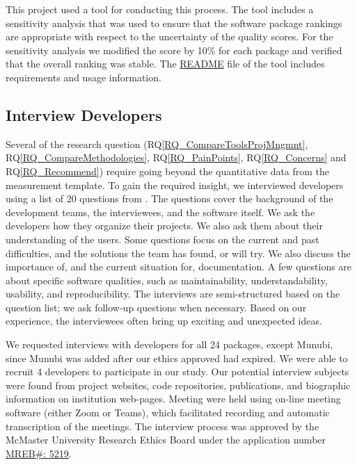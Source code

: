 \documentclass[final, 3p, times, authoryear]{elsarticle}
\newcommand{\rqref}[1]{RQ\ref{#1}}
\begin{document}
This project used a tool for conducting this process. The tool includes a
sensitivity analysis that was used to ensure that the software package rankings
are appropriate with respect to the uncertainty of the quality scores. For the
sensitivity analysis we modified the score by 10\% for each package and verified
that the overall ranking was stable.  The
\href{https://github.com/smiths/AIMSS/blob/master/StateOfPractice/AHP2020/LBM/README.txt}{README}
file of the tool includes requirements and usage information.

\subsection{Interview Developers} \label{SecSurvey}

Several of the research question (\rqref{RQ_CompareToolsProjMngmnt},
\rqref{RQ_CompareMethodologies}, \rqref{RQ_PainPoints}, \rqref{RQ_Concerns} and
\rqref{RQ_Recommend}) require going beyond the quantitative data from the
measurement template. To gain the required insight, we interviewed developers
using a list of 20 questions from \citet{SmithEtAl2021}. The questions cover the
background of the development teams, the interviewees, and the software itself.
We ask the developers how they organize their projects. We also ask them about
their understanding of the users. Some questions focus on the current and past
difficulties, and the solutions the team has found, or will try. We also discuss
the importance of, and the current situation for, documentation. A few questions
are about specific software qualities, such as maintainability,
understandability, usability, and reproducibility. The interviews are
semi-structured based on the question list; we ask follow-up questions when
necessary. Based on our experience, the interviewees often bring up exciting and
unexpected ideas.

We requested interviews with developers for all 24 packages, except Munubi,
since Munubi was added after our ethics approved had expired.  We were able to
recruit 4 developers to participate in our study.  Our potential interview
subjects were found from project websites, code repositories, publications, and
biographic information on institution web-pages. Meeting were held using on-line
meeting software (either Zoom or Teams), which facilitated recording and
automatic transcription of the meetings.  The interview process was approved by
the McMaster University Research Ethics Board under the application number 
\href{https://github.com/smiths/AIMSS/blob/master/StateOfPractice/MACREM/Application.pdf}
{MREB\#: 5219}.
\end{document}
